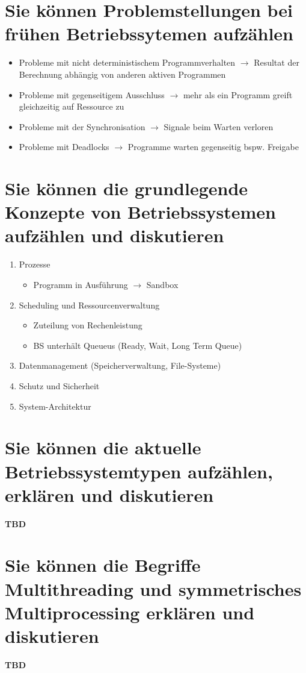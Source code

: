\documentclass{report}
\theoremstyle{definition}
\theoremstyle{example}
\begin{document}
\section{Sie können Problemstellungen bei frühen Betriebssytemen aufzählen}
	\begin{itemize}
		\item Probleme mit nicht deterministischem Programmverhalten $\rightarrow$ Resultat der Berechnung abhängig von anderen aktiven Programmen
		\item Probleme mit gegenseitigem Ausschluss $\rightarrow$ mehr als ein Programm greift gleichzeitig auf Ressource zu
		\item Probleme mit der Synchronisation $\rightarrow$ Signale beim Warten verloren
		\item Probleme mit Deadlocks $\rightarrow$ Programme warten gegenseitig bspw. Freigabe
	\end{itemize}

\section{Sie können die grundlegende Konzepte von Betriebssystemen aufzählen und diskutieren}
	\begin{enumerate}
		\item Prozesse
		\begin{itemize}
			\item Programm in Ausführung $\rightarrow$ Sandbox
		\end{itemize}
		\item Scheduling und Ressourcenverwaltung
		\begin{itemize}
			\item Zuteilung von Rechenleistung
			\item BS unterhält Queueus (Ready, Wait, Long Term Queue)
		\end{itemize}
		\item Datenmanagement (Speicherverwaltung, File-Systeme)
		\item Schutz und Sicherheit
		\item System-Architektur
	\end{enumerate}

\section{Sie können die aktuelle Betriebssystemtypen aufzählen, erklären und diskutieren}
\textbf{TBD}

\section{Sie können die Begriffe Multithreading und symmetrisches Multiprocessing erklären und diskutieren}
\textbf{TBD}
\end{document}
